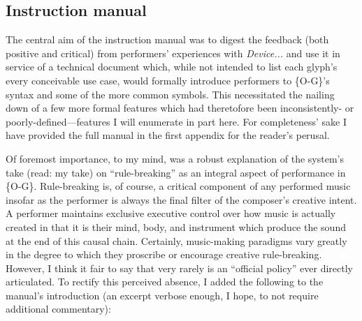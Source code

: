     \subsection{Instruction manual}
    \label{sec:instruction-manual}


    The central aim of the instruction manual was to digest the feedback (both positive and critical) from performers' experiences with \textit{Device...} and use it in service of a technical document which, while not intended to list each glyph's every conceivable use case, would formally introduce performers to \{O-G\}'s syntax and some of the more common symbols. This necessitated the nailing down of a few more formal features which had theretofore been inconsistently- or poorly-defined---features I will enumerate in part here. For completeness' sake I have provided the full manual in the first appendix for the reader's perusal. 

    Of foremost importance, to my mind, was a robust explanation of the system's take (read: my take) on ``rule-breaking'' as an integral aspect of performance in \{O-G\}. Rule-breaking is, of course, a critical component of any performed music insofar as the performer is always the final filter of the composer's creative intent. A performer maintains exclusive executive control over how music is actually created in that it is their mind, body, and instrument which produce the sound at the end of this causal chain. Certainly, music-making paradigms vary greatly in the degree to which they proscribe or encourage creative rule-breaking. However, I think it fair to say that very rarely is an ``official policy'' ever directly articulated. To rectify this perceived absence, I added the following to the manual's introduction (an excerpt verbose enough, I hope, to not require additional commentary):

